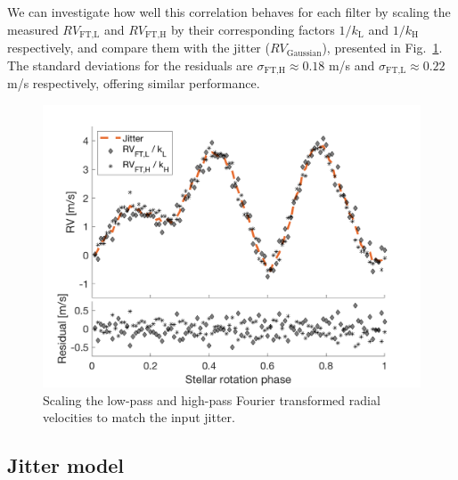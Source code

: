 We can investigate how well this correlation behaves for each filter by scaling the measured $RV_\text{FT,L}$ and $RV_\text{FT,H}$ by their corresponding factors $1/k_\text{L}$ and $1/k_\text{H}$ respectively, and compare them with the jitter ($RV_\text{Gaussian}$), presented in Fig.~\ref{fig:scaling_RV_FT}. The standard deviations for the residuals are $\sigma_\text{FT,H} \approx 0.18$ m/s and $\sigma_\text{FT,L} \approx 0.22$ m/s respectively, offering similar performance.


\begin{figure}[tbp]
\centering
\includegraphics[width = 0.7 \linewidth]
{./Figures/Methods/5-JITTER_ONLY_4.png}
\caption[Scaling the low-pass and high-pass Fourier transformed radial velocities]
{Scaling the low-pass and high-pass Fourier transformed radial velocities to match the input jitter.}
\label{fig:scaling_RV_FT}
\end{figure} 

\subsection{Jitter model}
\label{subsec:Jitter_model}

